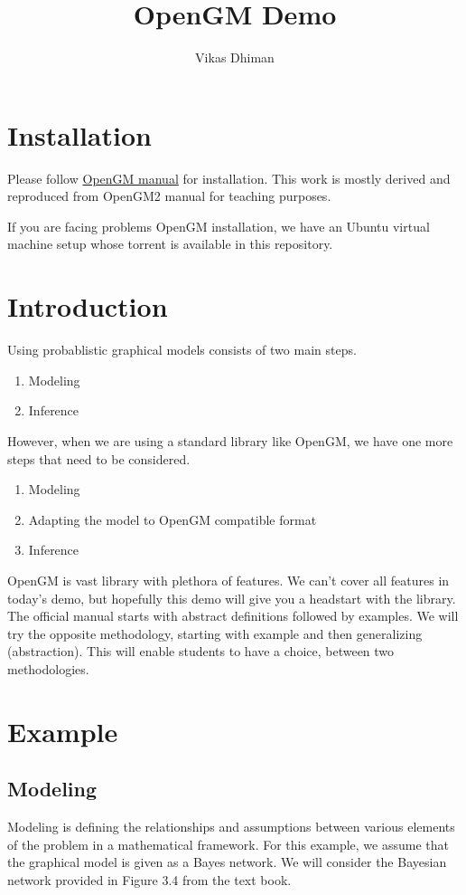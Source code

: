 \documentclass[12pt,oneside,letterpaper]{article}
\title{OpenGM Demo}
\author{Vikas Dhiman}
\begin{document}
\maketitle
\section{Installation}

Please follow \href{http://www.andres.sc/publications/opengm-2.0.2-beta-manual.pdf}{OpenGM manual} \cite{andresopengm, andres2012opengm} for installation. This work is mostly derived and reproduced from OpenGM2 manual \cite{andresopengm} for teaching purposes.

If you are facing problems OpenGM installation, we have an Ubuntu virtual
machine setup whose torrent is available in this repository.

\section{Introduction}
Using probablistic graphical models consists of two main steps. 
\begin{enumerate}
  \item Modeling
  \item Inference
\end{enumerate}

However, when we are using a standard library like OpenGM, we have one more
steps that need to be considered.
\begin{enumerate}
  \item Modeling
  \item Adapting the model to OpenGM compatible format
  \item Inference
\end{enumerate}

OpenGM is vast library with plethora of features. We can't cover all features
in today's demo, but hopefully this demo will give you a headstart with the
library. The official manual starts with abstract definitions followed by
examples. We will try the opposite methodology, starting with example and then
generalizing (abstraction). This will enable students to have a choice, between two methodologies.

\section{Example}
\subsection{Modeling}
Modeling is defining the relationships and assumptions between various elements
of the problem in a mathematical framework. For this example, we assume that
the graphical model is given as a Bayes network.  We will consider the Bayesian
network provided in Figure 3.4 \cite[p 53]{koller2009probabilistic} from the text book.
\end{document}
